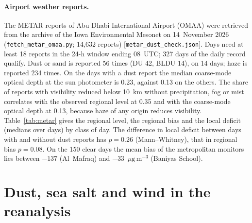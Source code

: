 \documentclass[11pt]{article}
\newcommand*{\ugm}{\ensuremath{\mu\mathrm{g\,m^{-3}}}}
\begin{document}
\paragraph{Airport weather reports.} The METAR reports of Abu Dhabi International Airport
(OMAA) were retrieved from the archive of the Iowa Environmental Mesonet on 14~November 2026
(\texttt{fetch\_metar\_omaa.py}; 14,632 reports) [\texttt{metar\_dust\_check.json}]. Days need at
least 18 reports in the 24-h window ending 08~UTC; 327 days of the daily record qualify. Dust or
sand is reported 56 times (DU 42, BLDU 14), on 14 days; haze is reported 234 times. On the days
with a dust report the median coarse-mode optical depth at the sun photometer is 0.23, against
0.13 on the others. The share of reports with visibility reduced below 10~km without
precipitation, fog or mist correlates with the observed regional level at 0.35 and with the
coarse-mode optical depth at 0.13, because haze of any origin reduces visibility.
Table~\ref{tab:metar} gives the regional level, the regional bias and the local deficit (medians
over days) by class of day. The difference in local deficit between days with and without dust
reports has $p=0.26$ (Mann--Whitney), that in regional bias $p=0.08$. On the 150 clear days the
mean bias of the metropolitan monitors lies between $-137$ (Al~Mafraq) and $-33$~\ugm{}
(Baniyas School).

\begin{table}[ht]\centering\small
\caption{Regional level, model minus observed regional level and metropolitan minus Al~Ain bias
(medians over days, \ugm{}) by class of day in the weather reports of Abu Dhabi International
Airport.}
\label{tab:metar}
\resizebox{\textwidth}{!}{}
\end{table}

\begin{table}[ht]\centering\small
\caption{Bias by tercile of the AERONET coarse-mode aerosol optical depth at DEWA Research Centre
(228 days). Concentrations and biases in \ugm{}; bias is CAMS minus observed, mean over
monitor-days. Lower part: number of days in each combination of regional and coarse-AOD tercile.}
\label{tab:aeronet}

\end{table}

\section{Dust, sea salt and wind in the reanalysis}
\end{document}
